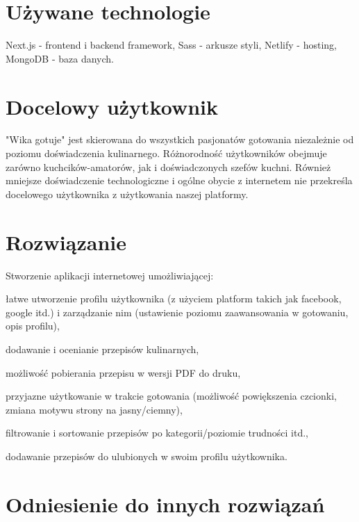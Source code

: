 \documentclass{article}
\newenvironment{itemize.zip}
{ \begin{itemize}
    \setlength{\itemsep}{0pt}
    \setlength{\parskip}{0pt}
    \setlength{\parsep}{0pt}     }
{ \end{itemize}                  }
\begin{document}
\section{Używane technologie}
      Next.js - frontend i backend framework,
      Sass - arkusze styli,
      Netlify - hosting,
      MongoDB - baza danych.

\section{Docelowy użytkownik}
"Wika gotuje" jest skierowana do wszystkich pasjonatów gotowania niezależnie od poziomu doświadczenia kulinarnego. Różnorodność użytkowników obejmuje zarówno kuchcików-amatorów, jak 
i doświadczonych szefów kuchni. Również mniejsze doświadczenie technologiczne i ogólne obycie z internetem nie przekreśla docelowego użytkownika z użytkowania naszej platformy.



\section{Rozwiązanie}
Stworzenie aplikacji internetowej umożliwiającej:
\begin{itemize.zip}
    \item łatwe utworzenie profilu użytkownika (z użyciem platform takich jak facebook, google itd.) i zarządzanie nim (ustawienie poziomu zaawansowania w gotowaniu, opis profilu),
    \item dodawanie i ocenianie przepisów kulinarnych,
    \item możliwość pobierania przepisu w wersji PDF do druku,
    \item przyjazne użytkowanie w trakcie gotowania (możliwość powiększenia czcionki, zmiana motywu strony na jasny/ciemny),
    \item filtrowanie i sortowanie przepisów po kategorii/poziomie trudności itd.,
    \item dodawanie przepisów do ulubionych w swoim profilu użytkownika.
\end{itemize.zip}

\section{Odniesienie do innych rozwiązań}
\end{document}
